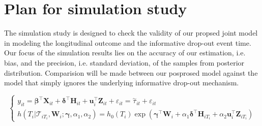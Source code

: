 






% 

\section{Plan for simulation study} 
The simulation study is designed to check the validity of our propsed joint model in modeling the longitudinal outcome and the informative drop-out event time. Our focus of the simulation results lies on the accuracy of our estimation, i.e. bias, and the precision, i.e. standard deviation, of the samples from posterior distribution. Comparision will be made between our posprosed model against the model that simply ignores the underlying informative drop-out mechanism.

\begin{equation}\label{eqn:joint}
\left\{
\begin{array}{l}
y_{it} = \boldsymbol{\beta}^{\top}{\boldsymbol X}_{it} + \boldsymbol{\delta}^{\top}{\boldsymbol H}_{it} + {\boldsymbol u}_i^{\top}{\boldsymbol Z}_{it} + \varepsilon_{it} =\overset{\sim}{\tau}_{it} + \varepsilon_{it}\\
h(T_i|\mathcal{T}_{iT_i}, {\boldsymbol W}_i;  \boldsymbol{\gamma}, \alpha_1, 
\alpha_2) = h_0(T_i)\exp(\boldsymbol{\gamma}^{\top}{\boldsymbol W}_i + \alpha_1\boldsymbol{\delta}^{\top}{\boldsymbol H}_{iT_i} + \alpha_2{\boldsymbol u}_i^{\top}{\boldsymbol Z}_{iT_i})
\end{array}
\right.
\end{equation}


